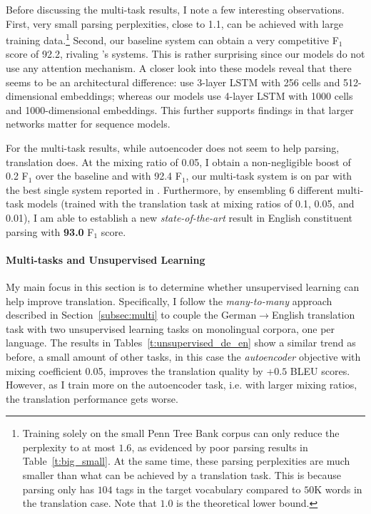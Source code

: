 \begin{sloppypar}
Before discussing the multi-task results, I note a few interesting
observations. First, very small parsing perplexities, close to 1.1, can be achieved with large
training data.\footnote{Training solely on the small Penn Tree Bank
corpus can only reduce the perplexity to at most $1.6$, as evidenced by poor
parsing results in Table~\ref{t:big_small}. At the same time, these parsing
perplexities are much smaller than
what can be achieved by a translation task. This is because parsing only has
$104$ tags in the target vocabulary compared to
$50$K words in the translation case. Note that $1.0$ is the theoretical
lower bound.}  
Second, our baseline system can obtain a very competitive F$_1$ score of
92.2, rivaling \citet{vinyals15grammar}'s systems. This is rather surprising
since our models do not use any attention mechanism. A closer look into these
models reveal that there seems to be an architectural difference:
\citet{vinyals15grammar} use 3-layer LSTM with 256 cells and
512-dimensional embeddings; whereas our models use 4-layer LSTM with 1000 cells and
1000-dimensional embeddings. This further supports findings in \citep{rafal16} that
larger networks matter for sequence models.
\end{sloppypar}

For the multi-task results, while autoencoder does not seem to help parsing,
translation does. At the mixing ratio of 0.05, I obtain a non-negligible boost of 0.2 F$_1$ 
over the baseline and with 92.4 F$_1$, our multi-task system is on par with the best single system reported in
\citep{vinyals15grammar}. Furthermore, by ensembling 6 different multi-task
models (trained with the translation task at mixing ratios of
0.1, 0.05, and 0.01), I am able to establish a new {\it state-of-the-art} result in
English constituent parsing with {\bf 93.0} F$_1$ score.

\paragraph{Multi-tasks and Unsupervised Learning}
My main focus in this section is to determine whether unsupervised
learning can help improve translation. Specifically, I follow the {\it
many-to-many} approach described in Section~\ref{subsec:multi} to couple
the German$\rightarrow$English translation task with two unsupervised learning
tasks on monolingual corpora, one per language.
The results in Tables~\ref{t:unsupervised_de_en} show a similar trend as before,
a small amount of other tasks, in this case the {\it autoencoder} objective with
mixing coefficient 0.05, improves the translation quality by +$0.5$ BLEU
scores. However, as I train more on the 
autoencoder task, i.e. with larger mixing ratios, the translation performance gets worse. 

